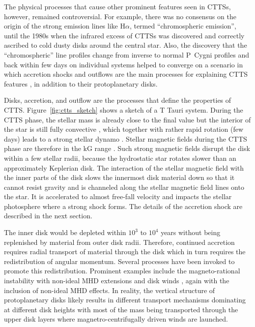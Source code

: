The physical processes that cause other prominent features seen in CTTSs, however, remained controversial.
For example, there was no consensus on the origin of the
strong emission lines like H$\alpha$, termed “chromospheric emission”, until the 1980s when the infrared excess of CTTSs was discovered and correctly ascribed to cold dusty disks around the central star. Also, the discovery that the ``chromospheric'' line profiles change from inverse to normal P~Cygni profiles and back within few days on individual systems helped to converge on a scenario in which accretion shocks and outflows are the main processes for explaining CTTS features \citep[as nicely described in][]{Bertout_2007}, in addition to their protoplanetary disks.

Disks, accretion, and outflow are the processes that define the properties of CTTS. Figure~\ref{fig:ctts_sketch} shows a sketch of a T Tauri system.
During the CTTS phase, the stellar mass is already close to the final value but the interior of the star is still fully convective \citep{}, which together with rather rapid rotation (few days) leads to a strong stellar dynamo \citep{}. Stellar magnetic fields during the CTTS phase are therefore in the kG range \citep[e.g.][]{2008MNRAS.386.1234D,2010MNRAS.402.1426D}. Such strong magnetic fields disrupt the disk within a few stellar radii, because the hydrostatic star rotates slower than an approximately Keplerian disk. The interaction of the stellar magnetic field with the inner parts of the disk slows the innermost disk material down so that it cannot resist gravity and is channeled along the stellar magnetic field lines onto the star. It is accelerated to almost free-fall velocity and impacts the stellar photosphere where a strong shock forms. The details of the accretion shock are described in the next section.%

The inner disk would be depleted within $10^3$ to $10^4$ years without being replenished by material from outer disk radii. Therefore, continued accretion requires radial transport of material through the disk which in turn requires the redistribution of angular momentum. Several processes have been invoked to promote this redistribution. Prominent examples include the magneto-rational instability \citep[MRI,][]{Balbus_1991} with non-ideal MHD extensions and disk winds \citep{Blandford_1982, Pudritz_1983}, again with the inclusion of non-ideal MHD effects. In reality, the vertical structure of protoplanetary disks likely results in different transport mechanisms dominating at different disk heights with most of the mass being transported through the upper disk layers where magnetro-centrifugally driven winds are launched.

